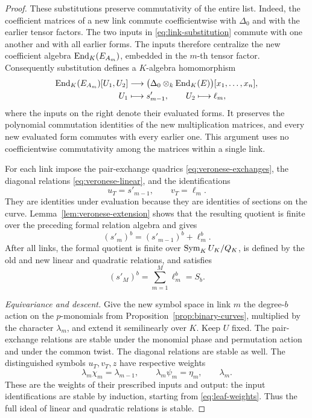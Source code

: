 \begin{proof}
These substitutions preserve commutativity of the entire list.
Indeed, the coefficient matrices of a new link commute coefficientwise
with \(\Delta_0\) and with the earlier tensor factors.
The two inputs in \eqref{eq:link-substitution} commute with one another
and with all earlier forms.
The inputs therefore centralize the new coefficient algebra
\(\operatorname{End}_K(E_{A_m})\), embedded in the \(m\)-th tensor factor.
Consequently substitution defines a \(K\)-algebra homomorphism
\[
 \begin{aligned}
 \operatorname{End}_K(E_{A_m})[U_1,U_2]
 &\longrightarrow
 \bigl(\Delta_0\otimes_k\operatorname{End}_K(E)\bigr)[x_1,\ldots,x_n],\\
 U_1&\longmapsto s'_{m-1},\qquad U_2\longmapsto\ell_m,
 \end{aligned}
\]
where the inputs on the right denote their evaluated forms.
It preserves the polynomial commutation identities of the new
multiplication matrices, and every new evaluated form commutes with
every earlier one.
This argument uses no coefficientwise commutativity among the matrices
within a single link.

For each link impose the pair-exchange quadrics
\eqref{eq:veronese-exchanges}, the diagonal relations
\eqref{eq:veronese-linear}, and the identifications
\[
 u_T=s'_{m-1},\qquad v_T=\ell_m.
\]
They are identities under evaluation because they are identities of
sections on the curve.
Lemma~\ref{lem:veronese-extension} shows that the resulting quotient is
finite over the preceding formal relation algebra and gives
\[
 (s'_m)^b=(s'_{m-1})^b+\ell_m^b.
\]
After all links, the formal quotient is finite over
\(\operatorname{Sym}_K U_K/Q_K\), is defined by the old and new linear and quadratic
relations, and satisfies
\begin{equation}
 (s'_M)^b=\sum_{m=1}^M\ell_m^b=S_b.
 \label{eq:telescoping-links}
\end{equation}

\smallskip\noindent
\emph{Equivariance and descent.}
Give the new symbol space in link \(m\) the degree-\(b\) action on the
\(p\)-monomials from Proposition~\ref{prop:binary-curves}, multiplied by
the character \(\lambda_m\), and extend it semilinearly over \(K\).
Keep \(U\) fixed.
The pair-exchange relations are stable under the monomial phase and
permutation action and under the common twist.
The diagonal relations are stable as well.
The distinguished symbols \(u_T,v_T,z\) have respective weights
\[
 \lambda_m\chi_m=\lambda_{m-1},\qquad
 \lambda_m\psi_m=\eta_m,\qquad
 \lambda_m.
\]
These are the weights of their prescribed inputs and output:
the input identifications are stable by induction, starting from
\eqref{eq:leaf-weights}.  Thus the full ideal of linear and quadratic
relations is stable.


\end{proof}
